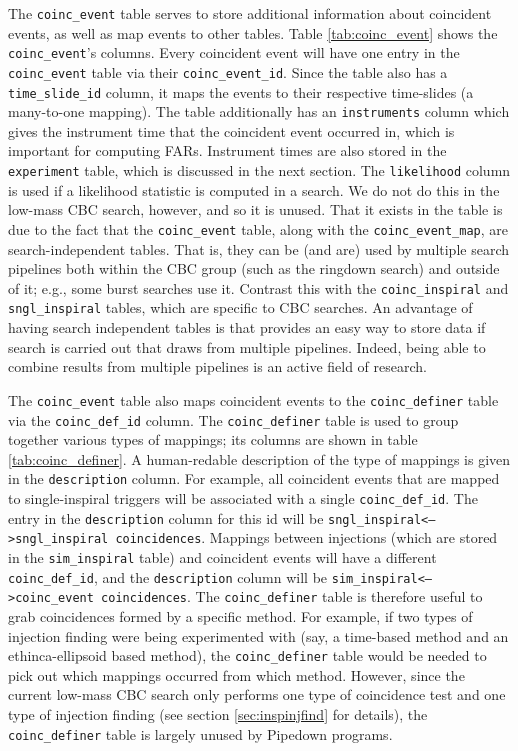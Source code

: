 The \texttt{coinc\_event} table serves to store additional information about coincident events, as well as map events to other tables. Table \ref{tab:coinc_event} shows the \texttt{coinc\_event}'s columns. Every coincident event will have one entry in the \texttt{coinc\_event} table via their \texttt{coinc\_event\_id}. Since the table also has a \texttt{time\_slide\_id} column, it maps the events to their respective time-slides (a many-to-one mapping). The table additionally has an \texttt{instruments} column which gives the instrument time that the coincident event occurred in, which is important for computing \acp{FAR}. Instrument times are also stored in the \texttt{experiment} table, which is discussed in the next section. The \texttt{likelihood} column is used if a likelihood statistic is computed in a search. We do not do this in the low-mass \ac{CBC} search, however, and so it is unused. That it exists in the table is due to the fact that the \texttt{coinc\_event} table, along with the \texttt{coinc\_event\_map}, are search-independent tables. That is, they can be (and are) used by multiple search pipelines both within the \ac{CBC} group (such as the ringdown search) and outside of it; e.g., some burst searches use it. Contrast this with the \texttt{coinc\_inspiral} and \texttt{sngl\_inspiral} tables, which are specific to \ac{CBC} searches. An advantage of having search independent tables is that provides an easy way to store data if search is carried out that draws from multiple pipelines. Indeed, being able to combine results from multiple pipelines is an active field of research.

The \texttt{coinc\_event} table also maps coincident events to the \texttt{coinc\_definer} table via the \texttt{coinc\_def\_id} column. The \texttt{coinc\_definer} table is used to group together various types of mappings; its columns are shown in table \ref{tab:coinc_definer}. A human-redable description of the type of mappings is given in the \texttt{description} column. For example, all coincident events that are mapped to single-inspiral triggers will be associated with a single \texttt{coinc\_def\_id}. The entry in the \texttt{description} column for this id will be \texttt{sngl\_inspiral<-->sngl\_inspiral coincidences}. Mappings between injections (which are stored in the \texttt{sim\_inspiral} table) and coincident events will have a different \texttt{coinc\_def\_id}, and the \texttt{description} column will be \texttt{sim\_inspiral<-->coinc\_event coincidences}. The \texttt{coinc\_definer} table is therefore useful to grab coincidences formed by a specific method. For example, if two types of injection finding were being experimented with (say, a time-based method and an ethinca-ellipsoid based method), the \texttt{coinc\_definer} table would be needed to pick out which mappings occurred from which method. However, since the current low-mass \ac{CBC} search only performs one type of coincidence test and one type of injection finding (see section \ref{sec:inspinjfind} for details), the \texttt{coinc\_definer} table is largely unused by Pipedown programs.

